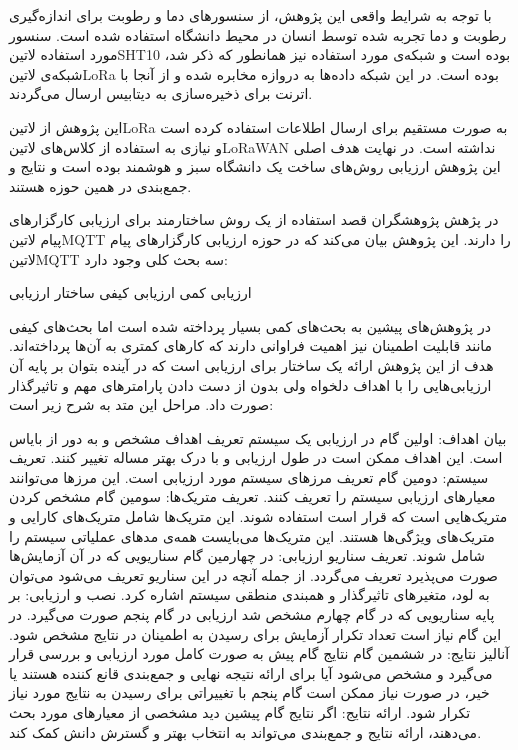 با توجه به شرایط واقعی این پژوهش، از سنسورهای دما و رطوبت برای اندازه‌گیری رطوبت و دما تجربه شده توسط انسان در محیط دانشگاه استفاده شده است.
سنسور مورد استفاده ‌لاتین{SHT10} بوده است و شبکه‌ی مورد استفاده نیز همانطور که ذکر شد، شبکه‌ی ‌لاتین{LoRa} بوده است. در این شبکه داده‌ها
به دروازه مخابره شده و از آنجا با اترنت برای ذخیره‌سازی به دیتابیس ارسال می‌گردند.

این پژوهش از ‌لاتین{LoRa} به صورت مستقیم برای ارسال اطلاعات استفاده کرده است و نیازی به استفاده از کلاس‌های ‌لاتین{LoRaWAN} نداشته است.
در نهایت هدف اصلی این پژوهش ارزیابی روش‌های ساخت یک دانشگاه سبز و هوشمند بوده است و نتایج و جمع‌بندی در همین حوزه هستند.



در پژهش  پژوهشگران قصد استفاده از یک روش ساختارمند برای ارزیابی کارگزار‌های پیام ‌لاتین{MQTT} را دارند.
این پژوهش بیان می‌کند که در حوزه ارزیابی کارگزار‌های پیام ‌لاتین{MQTT} سه بحث کلی وجود دارد:

 ارزیابی کمی
 ارزیابی کیفی
 ساختار ارزیابی

در پژوهش‌های پیشین به بحث‌های کمی بسیار پرداخته شده است اما بحث‌های کیفی مانند قابلیت اطمینان نیز اهمیت فراوانی دارند
که کارهای کمتری به آن‌ها پرداخته‌اند. هدف از این پژوهش ارائه یک ساختار برای ارزیابی است که در آینده بتوان بر پایه آن ارزیابی‌هایی
را با اهداف دلخواه ولی بدون از دست دادن پارامترهای مهم و تاثیرگذار صورت داد. مراحل این متد به شرح زیر است:

 بیان اهداف: اولین گام در ارزیابی یک سیستم تعریف اهداف مشخص و به دور از بایاس است. این اهداف ممکن است
در طول ارزیابی و با درک بهتر مساله تغییر کنند.
 تعریف سیستم: دومین گام تعریف مرزهای سیستم مورد ارزیابی است. این مرزها می‌توانند معیارهای ارزیابی
سیستم را تعریف کنند.
 تعریف متریک‌ها: سومین گام مشخص کردن متریک‌هایی است که قرار است استفاده شوند. این متریک‌ها شامل
متریک‌های کارایی و متریک‌های ویژگی‌ها هستند. این متریک‌ها می‌بایست همه‌ی مدهای عملیاتی سیستم را شامل شوند.
 تعریف سناریو ارزیابی: در چهارمین گام سناریویی که در آن آزمایش‌ها صورت می‌پذیرد تعریف می‌گردد. از جمله آنچه در این سناریو تعریف می‌شود
می‌توان به لود، متغیرهای تاثیرگذار و همبندی منطقی سیستم اشاره کرد.
 نصب و ارزیابی: بر پایه سناریویی که در گام چهارم مشخص شد ارزیابی در گام پنجم صورت می‌گیرد. در این گام نیاز است تعداد تکرار آزمایش برای
رسیدن به اطمینان در نتایج مشخص شود.
 آنالیز نتایج: در ششمین گام نتایج گام پیش به صورت کامل مورد ارزیابی و بررسی قرار می‌گیرد و مشخص می‌شود آیا برای ارائه نتیجه نهایی و جمع‌بندی
قانع کننده هستند یا خیر، در صورت نیاز ممکن است گام پنجم با تغییراتی برای رسیدن به نتایج مورد نیاز تکرار شود.
 ارائه نتایج: اگر نتایج گام پیشین دید مشخصی از معیارهای مورد بحث می‌دهند، ارائه نتایج و جمع‌بندی می‌تواند به انتخاب بهتر و گسترش دانش کمک کند.

